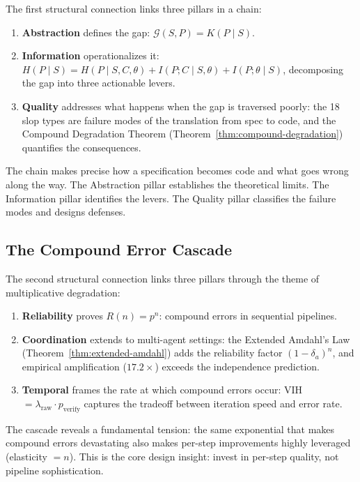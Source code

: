 \documentclass[11pt, a4paper]{googledeepmind}
\begin{document}
The first structural connection links three pillars in a chain:

\begin{enumerate}
    \item \textbf{Abstraction} defines the gap: $\mathcal{G}(S,P) = K(P \mid S)$.
    \item \textbf{Information} operationalizes it: $H(P \mid S) = H(P \mid S,C,\theta) + I(P;C \mid S,\theta) + I(P;\theta \mid S)$, decomposing the gap into three actionable levers.
    \item \textbf{Quality} addresses what happens when the gap is traversed poorly: the 18 slop types are failure modes of the translation from spec to code, and the Compound Degradation Theorem (Theorem~\ref{thm:compound-degradation}) quantifies the consequences.
\end{enumerate}

The chain makes precise how a specification becomes code and what goes wrong along the way. The Abstraction pillar establishes the theoretical limits. The Information pillar identifies the levers. The Quality pillar classifies the failure modes and designs defenses.

\subsection{The Compound Error Cascade}

The second structural connection links three pillars through the theme of multiplicative degradation:

\begin{enumerate}
    \item \textbf{Reliability} proves $R(n) = p^n$: compound errors in sequential pipelines.
    \item \textbf{Coordination} extends to multi-agent settings: the Extended Amdahl's Law (Theorem~\ref{thm:extended-amdahl}) adds the reliability factor $(1-\delta_a)^n$, and empirical amplification ($17.2\times$) exceeds the independence prediction.
    \item \textbf{Temporal} frames the rate at which compound errors occur: VIH $= \lambda_{\text{raw}} \cdot p_{\text{verify}}$ captures the tradeoff between iteration speed and error rate.
\end{enumerate}

The cascade reveals a fundamental tension: the same exponential that makes compound errors devastating also makes per-step improvements highly leveraged (elasticity $= n$). This is the core design insight: invest in per-step quality, not pipeline sophistication.
\end{document}
